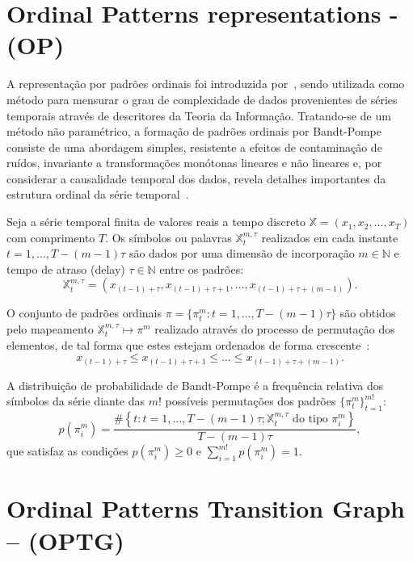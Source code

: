 \documentclass[12pt]{article}
\begin{document}
\section{Ordinal Patterns representations - (OP)}\label{OP}

A representação por padrões ordinais foi introduzida por~\cite{Bandt2002Permutation}, sendo utilizada como método para mensurar o grau de complexidade de dados provenientes de séries temporais através de descritores da Teoria da Informação. 
Tratando-se de um método não paramétrico, a formação de padrões ordinais por Bandt-Pompe consiste de uma abordagem simples, resistente a efeitos de contaminação de ruídos, invariante a transformações monótonas lineares e não lineares e, por considerar a causalidade temporal dos dados, revela detalhes importantes da estrutura ordinal da série temporal~\citep{Larrondo2006Random}.

Seja a série temporal finita de valores reais a tempo discreto $\mathbb{X} = (x_1, x_2, \dots, x_T)$ com comprimento $T$.
Os símbolos ou palavras $\mathbb{X}_t^{m,\tau}$ realizados em cada instante $t = 1, \dots, T-(m-1)\tau$ são dados por uma dimensão de incorporação $m \in \mathbb{N}$ e tempo de atraso (delay) $\tau \in \mathbb{N}$ entre os padrões: 
\begin{equation}
    \mathbb{X}_t^{m,\tau} = (x_{(t-1)+\tau}, x_{(t-1)+\tau+1},\ldots, x_{(t-1)+\tau+(m-1)}).
\end{equation}

O conjunto de padrões ordinais $\pi = \{\pi_t^m : t = 1, \dots, T-(m-1)\tau\}$ são obtidos pelo mapeamento $\mathbb{X}^{m,\tau}_t \mapsto \pi^m$ realizado através do processo de permutação dos elementos, de tal forma que estes estejam ordenados de forma crescente~\citep{Ravetti2014noise}:
$$ x_{(t-1)+\tau} \leq x_{(t-1)+\tau+1} \leq \ldots \leq x_{(t-1)+\tau+(m-1)}. $$ 

A distribuição de probabilidade de Bandt-Pompe é a frequência relativa dos símbolos da série diante das $m!$ possíveis permutações dos padrões $\{\pi_t^m\}_{t=1}^{m!}$:
\begin{equation}
    p(\pi_i^m) = \frac{\#\left \{t : t = 1, \dots, T-(m-1)\tau; \mathbb{X}_t^{m,\tau} \text{ do tipo } \pi_i^m\right \}}{T- (m-1)\tau},  
\end{equation}
que satisfaz as condições $p(\pi_i^m) \ge 0$ e  $\sum_{i=1}^{m!} p(\pi_i^m) = 1$.

\section{Ordinal Patterns Transition Graph -- (OPTG)}\label{OPTG}
\end{document}
